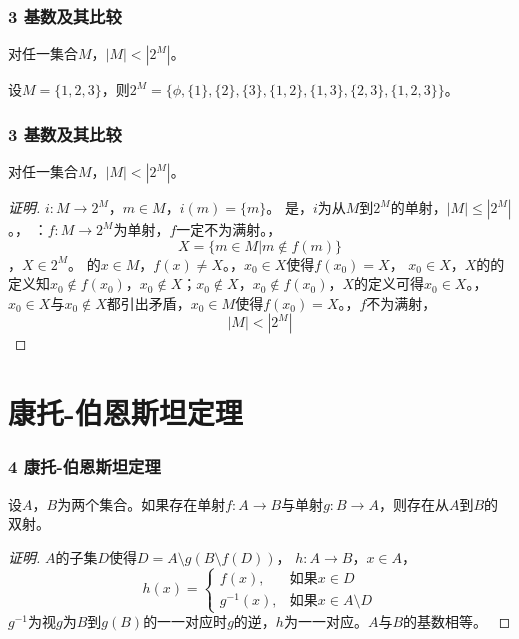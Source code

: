 \documentclass{beamer}
\begin{document}
\begin{CJK*}{UTF8}{gbsn}
\begin{frame}[t]
  \frametitle{3 基数及其比较}
  \begin{Thm}[康托]
    对任一集合$M$，$|M| < |2^{M}|$。
  \end{Thm}
\pause
  设$M=\{1,2,3\}$，则$2^{M}=\{\phi,\{1\},\{2\},\{3\},\{1,2\},\{1,3\},\{2,3\},\{1,2,3\}\}$。
\end{frame}
\begin{frame}[t]
  \frametitle{3 基数及其比较}
  \begin{Thm}[康托]
    对任一集合$M$，$|M| < |2^{M}|$。
  \end{Thm}
  \begin{proof}[证明]\justifying\let\raggedright\justifying
    $i:M\to 2^M$，$m\in M$，\pause$i(m)=\{m\}$。
    是，\pause$i$为从$M$到$2^M$的单射，$|M|\leq |2^M|$。，
    ：$f:M\to 2^M$为单射，$f$一定不为满射。，
    \[X=\{m\in M|m \notin f(m)\}\]，\pause$X\in 2^M$。
    的$x\in M$，\pause$f(x)\neq X$。，$x_0\in X$使得$f(x_0)=X$，
    $x_0\in X$，$X$的的定义知$x_0\notin
    f(x_0)$，$x_0\notin X$；$x_0\notin X$，$x_0\notin f(x_0)$，$X$的定义可得$x_0\in X$。，\pause$x_0\in X$与$x_0\notin X$都引出矛盾，$x_0\in M$使得$f(x_0)=X$。，\pause$f$不为满射，
    \[|M|<|2^M|\]
  \end{proof}
\end{frame}

\section{康托-伯恩斯坦定理}
\begin{frame}
  \frametitle{4 康托-伯恩斯坦定理}
  \begin{Thm}[康托-伯恩斯坦]
    设$A$，$B$为两个集合。如果存在单射$f:A\to B$与单射$g:B\to A$，则存在从$A$到$B$的双射。
  \end{Thm}\pause
  \begin{proof}[证明]{\small
    $A$的子集$D$使得$D=A\setminus g(B\setminus f(D))$，
    $h:A\to B$，$x\in A$，\pause
    \[h(x)=\begin{cases}
        f(x),&\text{如果}x\in D\\
        g^{-1}(x),&\text{如果}x\in A\setminus D
      \end{cases}
    \]
    $g^{-1}$为视$g$为$B$到$g(B)$的一一对应时$g$的逆，$h$为一一对应。$A$与$B$的基数相等。
    }
  \end{proof}
\end{frame}


\end{CJK*}
\end{document}
